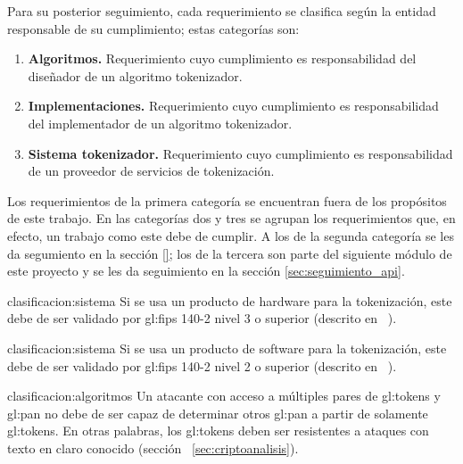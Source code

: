 Para su posterior seguimiento, cada requerimiento se clasifica según la
entidad responsable de su cumplimiento; estas categorías son:

\begin{enumerate}

  \item \textbf{\hypertarget{clasificacion:algoritmos}{Algoritmos}.}
    Requerimiento cuyo cumplimiento es responsabilidad del diseñador de un
    algoritmo tokenizador.

  \item \textbf{\hypertarget{clasificacion:implementaciones}{Implementaciones}.}
    Requerimiento cuyo cumplimiento es responsabilidad del implementador de un
    algoritmo tokenizador.

  \item \textbf{\hypertarget{clasificacion:sistema}{Sistema tokenizador}.}
    Requerimiento cuyo cumplimiento es responsabilidad de un proveedor de
    servicios de tokenización.

\end{enumerate}

Los requerimientos de la primera categoría se encuentran fuera de los
propósitos de este trabajo. En las categorías dos y tres se agrupan
los requerimientos que, en efecto, un trabajo como este debe de cumplir.
A los de la segunda categoría se les da segumiento en la sección \ref{};
los de la tercera son parte del siguiente módulo de este proyecto y se les
da seguimiento en la sección \ref{sec:seguimiento_api}.

{clasificacion:sistema}
{
  Si se usa un producto de hardware para la tokenización, este debe de ser
  validado por \gls{gl:fips} 140-2 nivel 3 o superior (descrito en
 ~\cite{nist_modulos_criptograficos}).
}

{clasificacion:sistema}
{
  Si se usa un producto de software para la tokenización, este debe de ser
  validado por \gls{gl:fips} 140-2 nivel 2 o superior (descrito en
 ~\cite{nist_modulos_criptograficos}).
}

{clasificacion:algoritmos}
{
  Un atacante con acceso a múltiples pares de \glspl{gl:token} y
  \gls{gl:pan} no debe de ser capaz de determinar otros \gls{gl:pan} a partir
  de solamente \glspl{gl:token}. En otras palabras, los \glspl{gl:token}
  deben ser resistentes a ataques con texto en claro conocido (sección
 ~\ref{sec:criptoanalisis}).
}

